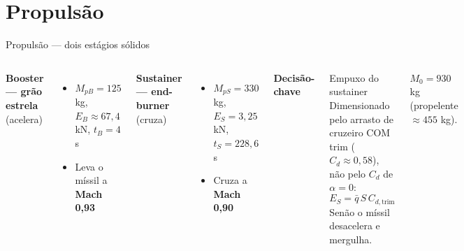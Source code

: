 \documentclass[aspectratio=169,11pt]{beamer}
\begin{document}
\section{Propulsão}
\begin{frame}{Propulsão --- dois estágios sólidos}
  \begin{columns}[T]
      \textbf{Booster --- grão estrela} (acelera)
      \begin{itemize}\small
        \item $M_{pB}=125$ kg, $E_B \approx 67{,}4$ kN, $t_B=4$ s
        \item Leva o míssil a \textbf{Mach 0{,}93}
      \end{itemize}
      \vspace{1em}
      \textbf{Sustainer --- end-burner} (cruza)
      \begin{itemize}\small
        \item $M_{pS}=330$ kg, $E_S = 3{,}25$ kN, $t_S=228{,}6$ s
        \item Cruza a \textbf{Mach 0{,}90}
      \end{itemize}
      \textbf{Decisão-chave}
      \begin{block}{Empuxo do sustainer}
        Dimensionado pelo \alert{arrasto de cruzeiro COM trim}
        ($C_d\approx0{,}58$), não pelo $C_d$ de $\alpha=0$:
        \[ E_S = \bar q\,S\,C_{d,\text{trim}} \]
        Senão o míssil desacelera e mergulha.
      \end{block}
      $M_0 = 930$ kg (propelente $\approx 455$ kg).
  \end{columns}
\end{frame}

\end{document}
